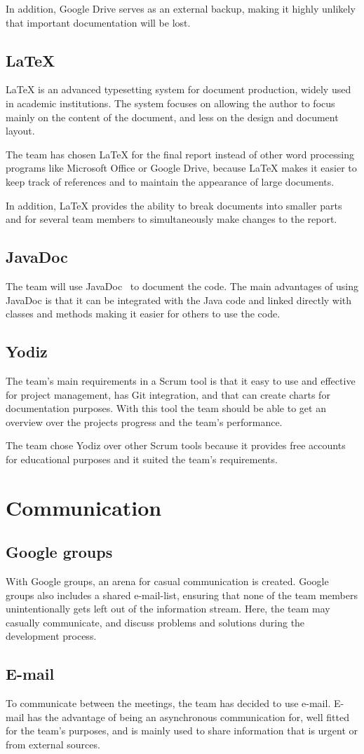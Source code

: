 In addition, Google Drive serves as an external backup, making it highly unlikely that important documentation will be lost. 


\subsection{\LaTeX}
LaTeX is an advanced typesetting system for document production, widely used in
academic institutions. The system focuses on allowing the author to focus mainly on the content of the document, and less on the design and document layout.

The team has chosen LaTeX for the final report instead of other word processing programs like Microsoft Office or Google Drive, because LaTeX makes it easier to keep track of references and to maintain the appearance of large
documents. 

In addition, LaTeX provides the ability to break documents into smaller parts and for several team members to simultaneously make changes to the report.


\subsection{JavaDoc}
The team will use JavaDoc~\cite{javadoc} to document the code. The main advantages of using JavaDoc is that it can be integrated with the Java code and linked directly with classes and methods making it easier for others to use the code.

\subsection{Yodiz}
The team's main requirements in a Scrum tool is that it easy to use and effective for project management, has Git integration, and that can create charts for documentation purposes. With this tool the team should be able to get an overview over the projects progress and the team's performance. 

The team chose Yodiz over other Scrum tools because it provides 
free accounts for educational purposes and it suited the team's requirements. 

\section{Communication}
\subsection{Google groups}
With Google groups, an arena for casual communication is created. Google groups also includes a shared e-mail-list, ensuring that none of the team members unintentionally gets left out of the information stream. Here, the team may casually communicate, and discuss problems and solutions during the development process.


\subsection{E-mail}
To communicate between the meetings, the team has decided to use e-mail. E-mail has the advantage of being an asynchronous communication for, well fitted for the team's purposes, and is mainly used to share information that is urgent or from external sources.

